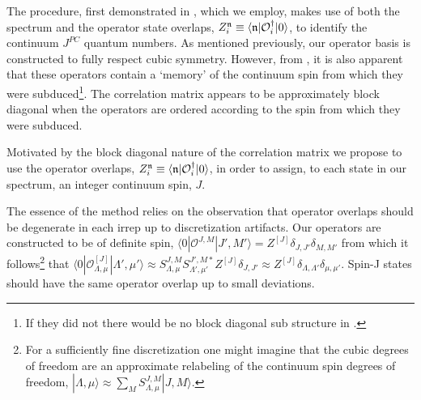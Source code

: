 The procedure, first demonstrated in \cite{Dudek:2009qf}, which we employ, makes use of both the spectrum and the operator state overlaps,  $Z_i^{\mathfrak{n}} \equiv \langle \mathfrak{n} | \mathcal{O}^\dagger_i | 0 \rangle$, to identify the continuum $J^{PC}$ quantum numbers. As mentioned previously, our operator basis is constructed to fully respect cubic symmetry. However, from , it is also apparent that these operators contain a `memory' of the continuum spin from which they were subduced\footnote{If they did not there would be no block diagonal sub structure in  .}.  The correlation matrix appears to be approximately block diagonal when the operators are ordered according to the spin from which they were subduced. %

Motivated by the block diagonal nature of the correlation matrix we propose to use the operator overlaps, $Z_i^{\mathfrak{n}} \equiv \langle \mathfrak{n} | \mathcal{O}^\dagger_i | 0 \rangle$, in order to assign, to each state in our spectrum, an integer continuum spin, $J$. 

The essence of the method relies on the observation that operator overlaps should be degenerate in each irrep up to discretization artifacts. Our operators are constructed to be of definite spin, $\langle 0 | \mathcal{O}^{J,M} | J',M' \rangle = Z^{[J]}\delta_{J,J'}\delta_{M,M'}$ from which it follows\footnote{For a sufficiently fine discretization one might imagine that the cubic degrees of freedom are an approximate relabeling of the continuum spin degrees of freedom, $| \Lambda, \mu \rangle \approx \sum_{M} S^{J,M}_{\Lambda,\mu} | J, M\rangle$. } that  $\langle 0 | \mathcal{O}^{[J]}_{\Lambda,\mu} | \Lambda',\mu' \rangle \approx S^{J,M}_{\Lambda,\mu}S^{J',M*}_{\Lambda',\mu'}Z^{[J]}\delta_{J,J'} \approx Z^{[J]}\delta_{\Lambda,\Lambda'}\delta_{\mu,\mu'}$. Spin-J states should have the same operator overlap up to small deviations. 

